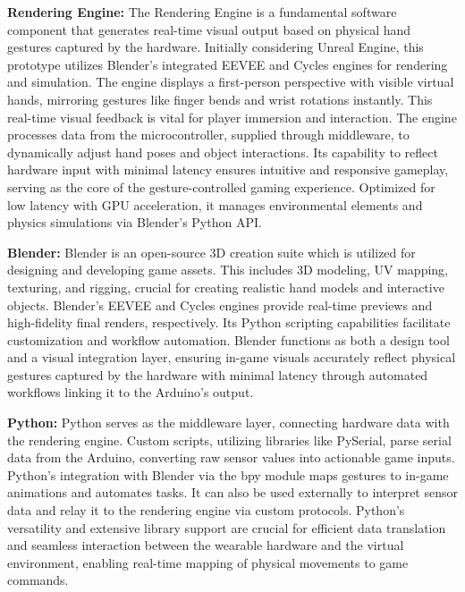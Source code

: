 \textbf{Rendering Engine:} The Rendering Engine is a fundamental software component that generates real-time visual output based on physical hand gestures captured by the hardware. Initially considering Unreal Engine, this prototype utilizes Blender's integrated EEVEE and Cycles engines for rendering and simulation. The engine displays a first-person perspective with visible virtual hands, mirroring gestures like finger bends and wrist rotations instantly. This real-time visual feedback is vital for player immersion and interaction. The engine processes data from the microcontroller, supplied through middleware, to dynamically adjust hand poses and object interactions. Its capability to reflect hardware input with minimal latency ensures intuitive and responsive gameplay, serving as the core of the gesture-controlled gaming experience. Optimized for low latency with GPU acceleration, it manages environmental elements and physics simulations via Blender's Python API.

\textbf{Blender:} Blender is an open-source 3D creation suite which is utilized for designing and developing game assets. This includes 3D modeling, UV mapping, texturing, and rigging, crucial for creating realistic hand models and interactive objects. Blender's EEVEE and Cycles engines provide real-time previews and high-fidelity final renders, respectively. Its Python scripting capabilities facilitate customization and workflow automation. Blender functions as both a design tool and a visual integration layer, ensuring in-game visuals accurately reflect physical gestures captured by the hardware with minimal latency through automated workflows linking it to the Arduino's output. 

\textbf{Python:} Python serves as the middleware layer, connecting hardware data with the rendering engine. Custom scripts, utilizing libraries like PySerial, parse serial data from the Arduino, converting raw sensor values into actionable game inputs. Python's integration with Blender via the bpy module maps gestures to in-game animations and automates tasks. It can also be used externally to interpret sensor data and relay it to the rendering engine via custom protocols. Python's versatility and extensive library support are crucial for efficient data translation and seamless interaction between the wearable hardware and the virtual environment, enabling real-time mapping of physical movements to game commands. 

